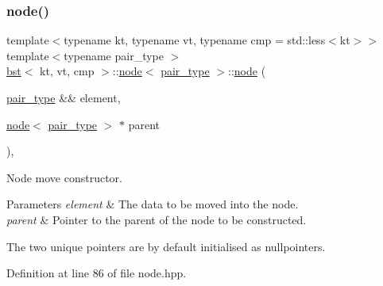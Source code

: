 \mbox{\label{structbst_1_1node_afb49ebb92c139b1a3fdaf71048b0dc1a}} 
\subsubsection{\texorpdfstring{node()}{node()}\hspace{0.1cm}{\footnotesize\ttfamily [3/5]}}
{\footnotesize\ttfamily template$<$typename kt, typename vt, typename cmp = std\+::less$<$kt$>$$>$ \\
template$<$typename pair\+\_\+type $>$ \\
\hyperlink{classbst}{bst}$<$ kt, vt, cmp $>$\+::\hyperlink{structbst_1_1node}{node}$<$ \hyperlink{classbst_a7b11cca2a3b4394915600194f741ab16}{pair\+\_\+type} $>$\+::\hyperlink{structbst_1_1node}{node} (\begin{DoxyParamCaption}\item[{\hyperlink{classbst_a7b11cca2a3b4394915600194f741ab16}{pair\+\_\+type} \&\&}]{element,  }\item[{\hyperlink{structbst_1_1node}{node}$<$ \hyperlink{classbst_a7b11cca2a3b4394915600194f741ab16}{pair\+\_\+type} $>$ $\ast$}]{parent }\end{DoxyParamCaption})\hspace{0.3cm}{\ttfamily [inline]}, {\ttfamily [noexcept]}}



Node move constructor. 


\begin{DoxyParams}{Parameters}
{\em element} & The data to be moved into the node. \\
\hline
{\em parent} & Pointer to the parent of the node to be constructed.\\
\hline
\end{DoxyParams}
The two unique pointers are by default initialised as nullpointers. 

Definition at line 86 of file node.\+hpp.

\mbox{\label{structbst_1_1node_a9970c480ef885a64710303bc9e3e6558}} 
